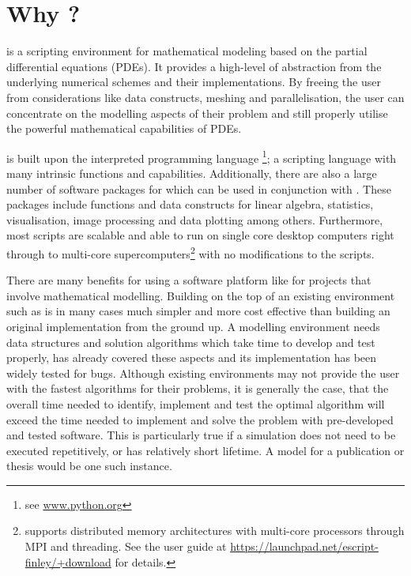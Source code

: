 
%
%
%

\section{Why \esc?}
\esc is a scripting environment for mathematical modeling based on the partial differential equations (PDEs). It provides a high-level of abstraction from the underlying numerical schemes and their implementations. By freeing the user from considerations like data constructs, meshing and parallelisation, the user can concentrate on the modelling aspects of their problem and still properly utilise the powerful mathematical capabilities of PDEs. 

\esc is built upon the interpreted programming language \pyt\footnote{see \url{www.python.org}}; a scripting language with many intrinsic functions and capabilities. Additionally, there are also a large number of software packages for \pyt which can be used in conjunction with \esc. These packages include functions and data constructs for linear algebra, statistics, visualisation, image processing and data plotting among others. Furthermore, most \esc scripts are scalable and able to run on single core desktop computers right through to multi-core supercomputers\footnote{\esc supports distributed memory architectures with multi-core processors through MPI and threading. See the \esc user guide at \url{https://launchpad.net/escript-finley/+download} for details.} with no modifications to the scripts. 

There are many benefits for using a software platform like \esc for projects that involve mathematical modelling. Building on the top of an existing environment such as \esc is in many cases much simpler and more cost effective than building an original implementation from the ground up. A modelling environment needs data structures and solution algorithms which take time to develop and test properly, \esc has already covered these aspects and its implementation has been widely tested for bugs. Although existing environments may not provide the user with the fastest algorithms for their problems, it is generally the case, that the overall time needed to identify, implement and test the optimal algorithm will exceed the time needed to implement and solve the problem with pre-developed and tested software. This is particularly true if a simulation does not need to be executed repetitively, or has relatively short lifetime. A model for a publication or thesis would be one such instance. 

